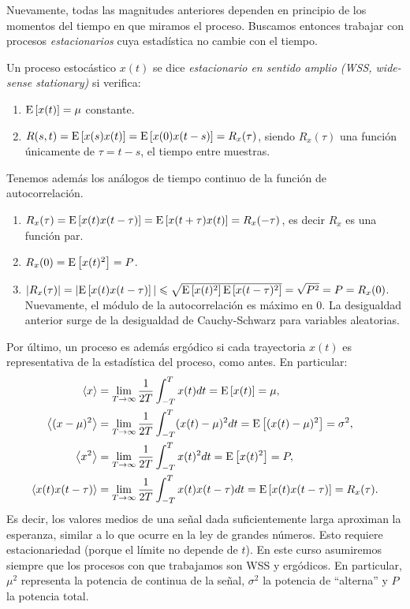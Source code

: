 Nuevamente, todas las magnitudes anteriores dependen en principio de los momentos del tiempo en que miramos el proceso. Buscamos entonces trabajar con procesos \emph{estacionarios} cuya estadística no cambie con el tiempo.
\begin{definicion}
    Un proceso estocástico $x(t)$ se dice \emph{estacionario en sentido amplio (WSS, wide-sense stationary)} si verifica:
    \begin{enumerate}
        \item $\mathrm{E}\left[x(t)\right] = \mu$ constante.
        \item $R(s,t) = \mathrm{E}\left[x(s)x(t)\right] = \mathrm{E}\left[x(0)x(t-s)\right] =  R_x(\tau)$, siendo $R_x(\tau)$ una función únicamente de $\tau = t-s$, el tiempo entre muestras.
    \end{enumerate}
\end{definicion}

Tenemos además los análogos de tiempo continuo de la función de autocorrelación.
\begin{enumerate}
    \item $R_x(\tau) = \mathrm{E}\left[x(t) x(t-\tau)\right] = \mathrm{E}\left[x(t+\tau)x(t)\right] = R_x(-\tau)$, es decir $R_x$ es una función par.
    \item $R_x(0) = \mathrm{E}\left[x(t)^2\right] = P$.
    \item $|R_x(\tau)| = |\mathrm{E}\left[x(t)x(t-\tau)\right]| \leqslant \sqrt{\mathrm{E}\left[x(t)^2\right]\mathrm{E}\left[x(t-\tau)^2\right]} =\sqrt{P^2} = P = R_x(0)$. 
Nuevamente, el módulo de la autocorrelación es máximo en $0$. La desigualdad anterior surge de la desigualdad de Cauchy-Schwarz para variables aleatorias.
\end{enumerate}

Por último, un proceso es además ergódico si cada trayectoria $x(t)$ es representativa de la estadística del proceso, como antes. En particular:
\begin{align*}
    \left\langle x \right\rangle  &= \lim_{T\to\infty} \frac{1}{2T}\int_{-T}^T x(t)dt = \mathrm{E}\left[x(t)\right] = \mu, \\
    \left\langle (x-\mu)^2 \right\rangle  &= \lim_{T\to\infty} \frac{1}{2T}\int_{-T}^T (x(t)-\mu)^2 dt = \mathrm{E}\left[(x(t)-\mu)^2\right] = \sigma^2, \\
    \left\langle x^2 \right\rangle &= \lim_{T\to\infty} \frac{1}{2T}\int_{-T}^T x(t)^2 dt = \mathrm{E}\left[x(t)^2\right] = P, \\
    \left\langle x(t) x(t-\tau) \right\rangle &= \lim_{T\to\infty} \frac{1}{2T}\int_{-T}^T x(t)x(t-\tau)dt = \mathrm{E}\left[x(t)x(t-\tau)\right] = R_x(\tau).
\end{align*}
Es decir, los valores medios de una señal dada suficientemente larga aproximan la esperanza, similar a lo que ocurre en la ley de grandes números. Esto requiere estacionariedad (porque el límite no depende de $t$). En este curso asumiremos siempre que los procesos con que trabajamos son WSS y ergódicos. En particular, $\mu^2$ representa la potencia de continua de la señal, $\sigma^2$ la potencia de ``alterna'' y $P$ la potencia total.

